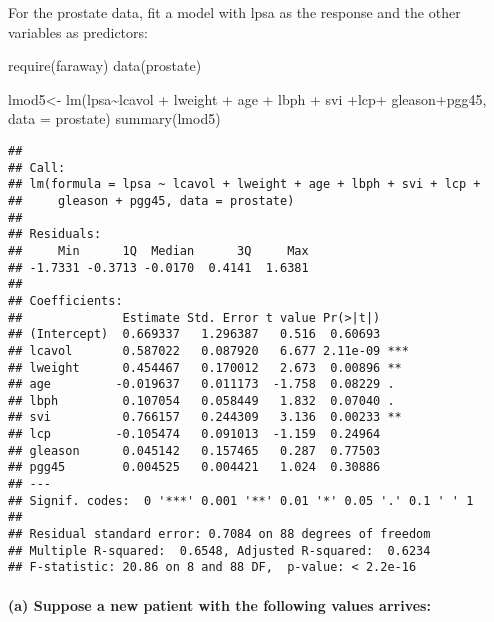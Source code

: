 \documentclass[
]{article}
\newenvironment{Shaded}{\begin{snugshade}}{\end{snugshade}}
\newcommand{\AttributeTok}[1]{\textcolor[rgb]{0.77,0.63,0.00}{#1}}
\newcommand{\FunctionTok}[1]{\textcolor[rgb]{0.00,0.00,0.00}{#1}}
\newcommand{\NormalTok}[1]{#1}
\newcommand{\OtherTok}[1]{\textcolor[rgb]{0.56,0.35,0.01}{#1}}
\newcommand{\SpecialCharTok}[1]{\textcolor[rgb]{0.00,0.00,0.00}{#1}}
\begin{document}
For the prostate data, fit a model with lpsa as the response and the
other variables as predictors:

\begin{Shaded}
\begin{Highlighting}[]
\FunctionTok{require}\NormalTok{(faraway)}
\FunctionTok{data}\NormalTok{(prostate)}
\end{Highlighting}
\end{Shaded}

\begin{Shaded}
\begin{Highlighting}[]
\NormalTok{lmod5}\OtherTok{\textless{}{-}} \FunctionTok{lm}\NormalTok{(lpsa}\SpecialCharTok{\textasciitilde{}}\NormalTok{lcavol }\SpecialCharTok{+}\NormalTok{ lweight }\SpecialCharTok{+}\NormalTok{ age }\SpecialCharTok{+}\NormalTok{ lbph }\SpecialCharTok{+}\NormalTok{ svi }\SpecialCharTok{+}\NormalTok{lcp}\SpecialCharTok{+}\NormalTok{ gleason}\SpecialCharTok{+}\NormalTok{pgg45, }\AttributeTok{data =}\NormalTok{ prostate)}
\FunctionTok{summary}\NormalTok{(lmod5)}
\end{Highlighting}
\end{Shaded}

\begin{verbatim}
## 
## Call:
## lm(formula = lpsa ~ lcavol + lweight + age + lbph + svi + lcp + 
##     gleason + pgg45, data = prostate)
## 
## Residuals:
##     Min      1Q  Median      3Q     Max 
## -1.7331 -0.3713 -0.0170  0.4141  1.6381 
## 
## Coefficients:
##              Estimate Std. Error t value Pr(>|t|)    
## (Intercept)  0.669337   1.296387   0.516  0.60693    
## lcavol       0.587022   0.087920   6.677 2.11e-09 ***
## lweight      0.454467   0.170012   2.673  0.00896 ** 
## age         -0.019637   0.011173  -1.758  0.08229 .  
## lbph         0.107054   0.058449   1.832  0.07040 .  
## svi          0.766157   0.244309   3.136  0.00233 ** 
## lcp         -0.105474   0.091013  -1.159  0.24964    
## gleason      0.045142   0.157465   0.287  0.77503    
## pgg45        0.004525   0.004421   1.024  0.30886    
## ---
## Signif. codes:  0 '***' 0.001 '**' 0.01 '*' 0.05 '.' 0.1 ' ' 1
## 
## Residual standard error: 0.7084 on 88 degrees of freedom
## Multiple R-squared:  0.6548, Adjusted R-squared:  0.6234 
## F-statistic: 20.86 on 8 and 88 DF,  p-value: < 2.2e-16
\end{verbatim}

\hypertarget{a-suppose-a-new-patient-with-the-following-values-arrives}{%
\paragraph{(a) Suppose a new patient with the following values
arrives:}\label{a-suppose-a-new-patient-with-the-following-values-arrives}}
\end{document}
